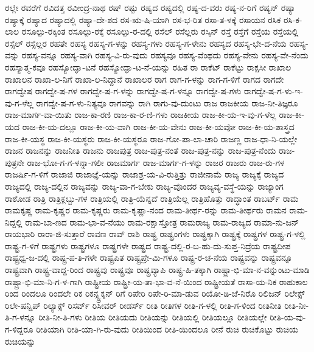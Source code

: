 {ರಲ್ಲೇ
ರವರೆಗೆ
ರವಿದತ್ತ
ರವೀಂದ್ರ-ನಾಥ
ರಷ್
ರಷ್ಟು
ರಷ್ಯದ
ರಷ್ಯದಲ್ಲಿ
ರಷ್ಯ-ದ-ವರು
ರಷ್ಯ-ನ-ರಿಗೆ
ರಷ್ಯನ್
ರಷ್ಯಾ
ರಷ್ಯಾಕ್ಕೆ
ರಷ್ಯಾದ
ರಷ್ಯಾದಲ್ಲಿ
ರಷ್ಯಾ-ದೇ-ಶದ
ರಸ-ಋ-ಷಿ-ಯಾಗಿ
ರಸ-ಭ-ರಿತ
ರಸಾ-ತ-ಳಕ್ಕೆ
ರಸಾಯನ
ರಸಿಕ
ರಸಿ-ಕ-ಲಾಲ
ರಸೂಲ್ಪು-ರಕ್ಕಿಂತ
ರಸೂಲ್ಪು-ರಕ್ಕೆ
ರಸೂಲ್ಪು-ರ-ದಲ್ಲಿ
ರಸೆಲ್
ರಸೆಲ್ಲರು
ರಸ್ಕಿನ್
ರಸ್ತೆ
ರಸ್ತೆಗೆ
ರಸ್ತೆಯ
ರಸ್ತೆಯಲ್ಲಿ
ರಸ್ಸೆಲ್
ರಸ್ಸೆಲ್ಲರ
ರಹತೇ
ರಹಸ್ಯ
ರಹಸ್ಯ-ಗ-ಳನ್ನು
ರಹಸ್ಯ-ಗಳು
ರಹಸ್ಯ-ಗ-ಳೇನು
ರಹಸ್ಯದ
ರಹಸ್ಯ-ಭೇ-ದ-ನೆಯ
ರಹಸ್ಯ-ವನ್ನು
ರಹಸ್ಯ-ವನ್ನೂ
ರಹಸ್ಯ-ವಾಗಿ
ರಹಸ್ಯ-ವಿ-ರು-ವುದು
ರಹಸ್ಯವೂ
ರಹಸ್ಯ-ವೆಂಥದು
ರಹಸ್ಯ-ವೇನು
ರಹಸ್ಯ-ವೇ-ನೆಂದು
ರಹಸ್ಯಾತ್ಮ-ಕವೂ
ರಹಸ್ಯೋದ್ಘಾ-ಟನೆ
ರಹಸ್ಯೋದ್ಘಾ-ಟ-ನೆ-ಯನ್ನು
ರಹಿತ
ರಾ
ರಾಕೆಟ್
ರಾಕೆಟ್ಟು
ರಾಕ್ಷಸೀ
ರಾಖಾಲ
ರಾಖಾಲನ
ರಾಖಾ-ಲ-ನಿಗೆ
ರಾಖಾ-ಲ-ನಿದ್ದಾನೆ
ರಾಖಾಲರ
ರಾಗ
ರಾಗ-ಗ-ಳನ್ನು
ರಾಗ-ಗ-ಳಿಗೆ
ರಾಗದ
ರಾಗದೇ
ರಾಗದ್ವೇಷ
ರಾಗದ್ವೇ-ಷ-ಗಳ
ರಾಗದ್ವೇ-ಷ-ಗ-ಳನ್ನು
ರಾಗದ್ವೇ-ಷ-ಗ-ಳನ್ನೂ
ರಾಗದ್ವೇ-ಷ-ಗಳು
ರಾಗದ್ವೇ-ಷ-ಗ-ಳು-ಇ-ವು-ಗ-ಳೆಲ್ಲ
ರಾಗದ್ವೇ-ಷ-ಗ-ಳು-ನಿತ್ಯವೂ
ರಾಗವನ್ನು
ರಾಗಿ
ರಾಗು-ವು-ದುಂಟು
ರಾಜ
ರಾಜಕೀಯ
ರಾಜ-ನೀ-ತಿಜ್ಞರೂ
ರಾಜ-ಮಾರ್ಗ-ವಾ-ಯಿತು
ರಾಜ-ಕಾ-ರಣಿ
ರಾಜ-ಕಾ-ರ-ಣಿ-ಗಳು
ರಾಜಕೀಯ
ರಾಜ-ಕೀ-ಯ-ಇ-ವು-ಗ-ಳೆಲ್ಲ
ರಾಜ-ಕೀ-ಯದ
ರಾಜ-ಕೀ-ಯ-ದಲ್ಲೂ
ರಾಜ-ಕೀ-ಯ-ವಾಗಿ
ರಾಜ-ಕೀ-ಯ-ವೇನು
ರಾಜ-ಕೀ-ಯವೋ
ರಾಜ-ಕೀ-ಯ-ಶಾಸ್ತ್ರದ
ರಾಜ-ಕೀ-ಯಸ್ಥ
ರಾಜ-ಕೀ-ಯಸ್ಥರು
ರಾಜ-ಕೀ-ಯಸ್ಥರೂ
ರಾಜ-ಗೋ-ಪಾ-ಲಾ-ಚಾರಿ
ರಾಜಣ್ಣ
ರಾಜ-ಧಾ-ನಿ-ಯಲ್ಲೇ
ರಾಜನ
ರಾಜನನ್ನು
ರಾಜನೀತಿ
ರಾಜನು
ರಾಜಪುತ್ರ
ರಾಜ-ಪುತ್ರ-ನಂತೆ
ರಾಜ-ಪುತ್ರ-ನನ್ನು
ರಾಜ-ಪುತ್ರ-ನೆಂದು
ರಾಜ-ಪುತ್ರನೇ
ರಾಜ-ಭೋ-ಗ-ಗ-ಳನ್ನಾ-ಗಲೀ
ರಾಜಮಾರ್ಗ
ರಾಜ-ಮಾರ್ಗ-ಗ-ಳನ್ನು
ರಾಜರ
ರಾಜರು
ರಾಜ-ರು-ಗಳ
ರಾಜರ್ಷಿ-ಗ-ಳಿಗೆ
ರಾಜಾಜಿ
ರಾಜಾಜ್ಞೆ-ಯನ್ನು
ರಾಜಾಶ್ರ-ಯ-ವಿ-ರುತ್ತಿತ್ತು
ರಾಜೀನಾಮೆ
ರಾಜ್ಯ
ರಾಜ್ಯಕ್ಕೆ
ರಾಜ್ಯದ
ರಾಜ್ಯದಲ್ಲಿ
ರಾಜ್ಯ-ದಲ್ಲಿನ
ರಾಜ್ಯವನ್ನು
ರಾಜ್ಯ-ವಾ-ಗ-ಬೇಕು
ರಾಜ್ಯ-ವೊಂದರ
ರಾಜ್ಯವ್ಯ-ವಸ್ಥೆ-ಯನ್ನು
ರಾಜ್ಯಾಂಗ
ರಾಠೋಡ
ರಾತ್ರಿ
ರಾತ್ರಿಕ್ಲಬ್ಬು-ಗಳ
ರಾತ್ರಿಯಲ್ಲಿ
ರಾತ್ರಿ-ಯೆನ್ನದೆ
ರಾತ್ರಿಯೆಲ್ಲ
ರಾತ್ರಿಹೊತ್ತು
ರಾದ್ಧಾಂತ
ರಾಬರ್ಟ್
ರಾಮ
ರಾಮಕೃಷ್ಣ
ರಾಮ-ಕೃಷ್ಣರ
ರಾಮ-ಕೃಷ್ಣರು
ರಾಮ-ಕೃಷ್ಣಾ-ನಂದ
ರಾಮ-ತೀರ್ಥ-ರನ್ನು
ರಾಮ-ತೀರ್ಥರು
ರಾಮನ
ರಾಮ-ನಿದ್ದಲ್ಲಿ
ರಾಮ-ಬಾ-ಣದ
ರಾಮ-ಭಾ-ವ-ನೆಯು
ರಾಮ-ರಕ್ಷಾಸ್ತೋತ್ರ
ರಾಮರಾಜ್ಯ
ರಾಮ-ರಾಜ್ಯದ
ರಾಮಾ-ನು-ಜನ್
ರಾಯಭಾರಿ
ರಾರಾ-ಜಿ-ಸುತ್ತಾರೆ
ರಾವಣ
ರಾವ್
ರಾಶಿ
ರಾಷ್ಟ್ರ
ರಾಷ್ಟ್ರಂಗಳು
ರಾಷ್ಟ್ರಕ್ಕಾಗಿ
ರಾಷ್ಟ್ರಕ್ಕೆ
ರಾಷ್ಟ್ರಗಳ
ರಾಷ್ಟ್ರ-ಗ-ಳಲ್ಲಿ
ರಾಷ್ಟ್ರ-ಗ-ಳಿಗೆ
ರಾಷ್ಟ್ರಗಳು
ರಾಷ್ಟ್ರಗಳೂ
ರಾಷ್ಟ್ರಗಳೇ
ರಾಷ್ಟ್ರದ
ರಾಷ್ಟ್ರ-ದಲ್ಲಿ-ರ-ಬ-ಹು-ದು-ಸುಪ್ತ-ನಿದ್ರೆಯ
ರಾಷ್ಟ್ರದೀಪ
ರಾಷ್ಟ್ರಧ್ವ-ಜ-ದಲ್ಲಿ
ರಾಷ್ಟ್ರ-ಪ-ತಿ-ಗಳೇ
ರಾಷ್ಟ್ರಪಿತ
ರಾಷ್ಟ್ರಪ್ರೇ-ಮಿ-ಗಳೂ
ರಾಷ್ಟ್ರ-ರ-ಚ-ನೆಯ
ರಾಷ್ಟ್ರವನ್ನು
ರಾಷ್ಟ್ರವನ್ನೂ
ರಾಷ್ಟ್ರವಾಗಿ
ರಾಷ್ಟ್ರ-ವಾದ್ದ-ರಿಂದ
ರಾಷ್ಟ್ರವು
ರಾಷ್ಟ್ರವೂ
ರಾಷ್ಟ್ರವ್ಯಾಪಿ
ರಾಷ್ಟ್ರ-ಹಿ-ತಕ್ಕಾಗಿ
ರಾಷ್ಟ್ರಾ-ಭಿ-ಮಾ-ನ-ವನ್ನುಂಟು-ಮಾಡಿ
ರಾಷ್ಟ್ರಾ-ಭಿ-ಮಾ-ನಿ-ಗ-ಳ-ಗಾಗಿ
ರಾಷ್ಟ್ರೀಯ
ರಾಷ್ಟ್ರೀ-ಯ-ತಾ-ಭಾ-ವ-ನೆ-ಯಿಂದ
ರಾಷ್ಟ್ರೀಯತೆ
ರಾಸಾ-ಯ-ನಿಕ
ರಾಹುಕಾಲ
ರಿಂದ
ರಿಂದಲೂ
ರಿಂದಲೇ
ರಿಕ
ರಿಕನ್ಸ್ಟ್ರಕ್ಶನ್
ರಿಗೆ
ರಿಪೇರಿ
ರಿಪೇ-ರಿ-ಮಾ-ಡುವ
ರಿಯೋ-ಡಿ-ಜೆ-ನಿರೊ
ರಿಲಿಜನ್
ರಿಲೇಕ್ಸ್
ರಿಲೇ-ಷನ್ಷಿಪ್
ರಿಲ್ಯಾಕ್ಸ್
ರಿಸರ್ವ್
ರಿಸೀವರ್
ರೀಡರ್ಸ್
ರೀತಿ
ರೀತಿಗಳ
ರೀತಿ-ಗ-ಳಲ್ಲಿ
ರೀತಿ-ಗ-ಳಿಂದ
ರೀತಿನೀತಿ
ರೀತಿ-ನೀ-ತಿ-ಗ-ಳನ್ನೂ
ರೀತಿ-ನೀ-ತಿ-ಗಳು
ರೀತಿಯ
ರೀತಿಯದು
ರೀತಿಯನ್ನು
ರೀತಿಯಲ್ಲಿ
ರೀತಿಯಲ್ಲೂ
ರೀತಿಯಲ್ಲೇ
ರೀತಿ-ಯ-ವು-ಗ-ಳಿದ್ದರೂ
ರೀತಿಯಾಗಿ
ರೀತಿ-ಯಾ-ಗಿ-ರು-ವುದು
ರೀತಿಯಿಂದ
ರೀತಿ-ಯಿಂದಲೂ
ರೀನೆ
ರುಚಿ
ರುಚಿಕೊಟ್ಟು
ರುಚಿಯ
ರುಚಿಯನ್ನು
}
